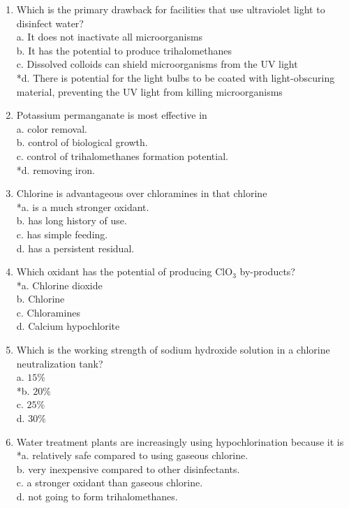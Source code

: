\begin{enumerate}[1.]
 \item Which is the primary drawback for facilities that use ultraviolet light to disinfect water?\\
a. It does not inactivate all microorganisms\\
b. It has the potential to produce trihalomethanes\\
c. Dissolved colloids can shield microorganisms from the UV light\\
*d. There is potential for the light bulbs to be coated with light-obscuring material, preventing the UV light from killing microorganisms \\

\item Potassium permanganate is most effective in\\
a. color removal.\\
b. control of biological growth.\\
c. control of trihalomethanes formation potential.\\
*d. removing iron.\\

\item Chlorine is advantageous over chloramines in that chlorine\\
*a. is a much stronger oxidant.\\
b. has long history of use.\\
c. has simple feeding.\\
d. has a persistent residual.\\

  \item Which oxidant has the potential of producing $\mathrm{ClO}_{3}$ by-products?\\
*a. Chlorine dioxide\\
b. Chlorine\\
c. Chloramines\\
d. Calcium hypochlorite\\

  \item Which is the working strength of sodium hydroxide solution in a chlorine neutralization tank?\\
a. $15 \%$\\
*b. $20 \%$\\
c. $25 \%$\\
d. $30 \%$\\

  \item Water treatment plants are increasingly using hypochlorination because it is\\
*a. relatively safe compared to using gaseous chlorine.\\
b. very inexpensive compared to other disinfectants.\\
c. a stronger oxidant than gaseous chlorine.\\
d. not going to form trihalomethanes.\\


\end{enumerate}
